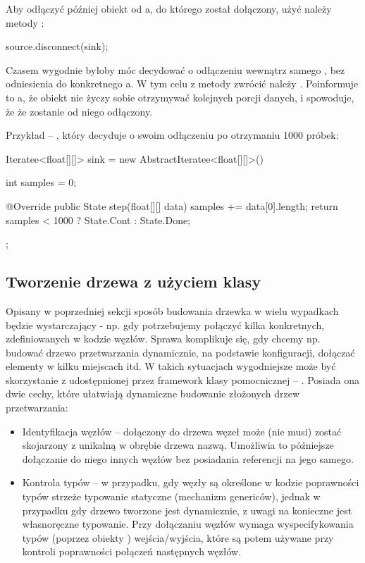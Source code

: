Aby odłączyć później obiekt  od a, do którego został dołączony, użyć
należy metody :

\begin{java}
source.disconnect(sink);
\end{java}

Czasem wygodnie byłoby móc decydować o odłączeniu wewnątrz samego , bez odniesienia
do konkretnego a. W tym celu z metody  zwrócić należy .
Poinformuje to a, że obiekt nie życzy sobie otrzymywać kolejnych porcji danych, i
spowoduje, że że zostanie od niego odłączony.

Przykład -- , który decyduje o swoim odłączeniu po otrzymaniu 1000 próbek:

\begin{java}
Iteratee<float[][]> sink = new AbstractIteratee<float[][]>() {

    int samples = 0;

    @Override
    public State step(float[][] data) {
        samples += data[0].length;
        return samples < 1000 ? State.Cont : State.Done;
    }
};
\end{java}


\subsection{Tworzenie drzewa z użyciem klasy }

Opisany w poprzedniej sekcji sposób budowania drzewka w wielu wypadkach będzie wystarczający - np.
gdy potrzebujemy połączyć kilka konkretnych, zdefiniowanych w kodzie węzłów. Sprawa komplikuje się,
gdy chcemy np. budować drzewo przetwarzania dynamicznie, na podstawie konfiguracji, dołączać
elementy w kilku miejscach itd. W takich sytuacjach wygodniejsze może być skorzystanie z
udostępnionej przez framework klasy pomocnicznej -- . Posiada ona dwie cechy, które
ułatwiają dynamiczne budowanie złożonych drzew przetwarzania:

\begin{itemize}
  \item{Identyfikacja węzłów} -- dołączony do drzewa węzeł może (nie musi) zostać skojarzony z
    unikalną w obrębie drzewa nazwą. Umożliwia to późniejsze dołączanie do niego innych węzłów bez
    posiadania referencji na jego samego.

  \item{Kontrola typów} -- w przypadku, gdy węzły są określone w kodzie poprawności typów strzeże
    typowanie statyczne (mechanizm genericów), jednak w przypadku gdy drzewo tworzone jest
    dynamicznie, z uwagi na  konieczne jest własnoręczne typowanie. Przy
    dołączaniu węzłów  wymaga wyspecifykowania typów (poprzez obiekty )
    wejścia/wyjścia, które są potem używane przy kontroli poprawności połączeń następnych węzłów.

\end{itemize}

